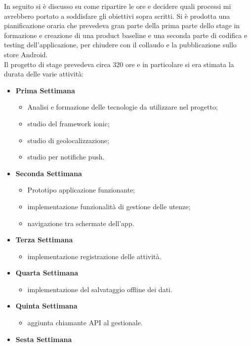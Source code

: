 In seguito si è discusso su come ripartire le ore e decidere quali processi mi avrebbero portato a soddisfare gli obiettivi sopra scritti. Si è prodotta una pianificazione oraria che prevedeva gran parte della prima parte dello stage in formazione e creazione di una \gls{product baseline} e una seconda parte di codifica e testing dell'applicazione, per chiudere con il collaudo e la pubblicazione sullo store Android. \\
Il progetto di stage prevedeva circa 320 ore e in particolare si era stimata la durata delle varie attività:
\begin{itemize}
		\item \textbf{Prima Settimana}
		\begin{itemize}
				\item Analisi e formazione delle tecnologie da utilizzare nel progetto;
				\item studio del framework ionic;
				\item studio di geolocalizzazione;
				\item studio per notifiche push.
		\end{itemize}
		\item \textbf{Seconda Settimana}
		\begin{itemize}
			\item Prototipo applicazione funzionante;
			\item implementazione funzionalità di gestione delle utenze;
			\item navigazione tra schermate dell’app.
		\end{itemize}
		\item \textbf{Terza Settimana}
		\begin{itemize}
				\item implementazione registrazione delle attività.
		\end{itemize}
		\item \textbf{Quarta Settimana}
		\begin{itemize}
				\item implementazione del salvataggio offline dei dati.
		\end{itemize}
		\item \textbf{Quinta Settimana}
		\begin{itemize}
				\item aggiunta chiamante API al gestionale.
		\end{itemize}
		\item \textbf{Sesta Settimana}
		\begin{itemize}

\end{itemize}
\end{itemize}
